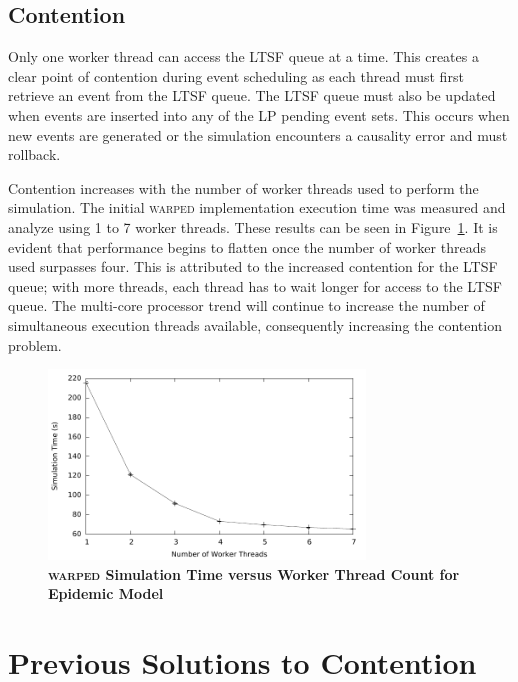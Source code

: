 \documentclass[11pt]{book}
\begin{document}
\subsection{Contention}

Only one worker thread can access the LTSF queue at a time.  This creates a clear point of
contention during event scheduling as each thread must first retrieve an event from the
LTSF queue.  The LTSF queue must also be updated when events are inserted into any of the
LP pending event sets.  This occurs when new events are generated or the simulation
encounters a causality error and must rollback.

Contention increases with the number of worker threads used to perform the simulation.
The initial \textsc{warped} implementation execution time was measured and analyze using 1
to 7 worker threads.  These results can be seen in Figure~\ref{fig:notsx_profile}.  It is
evident that performance begins to flatten once the number of worker threads used
surpasses four.  This is attributed to the increased contention for the LTSF queue; with
more threads, each thread has to wait longer for access to the LTSF queue.  The multi-core
processor trend will continue to increase the number of simultaneous execution threads
available, consequently increasing the contention problem.

\begin{figure}
    \centering
    \graphicspath{ {./figures/} }
    \includegraphics[width=0.75\textwidth,keepaspectratio]{notsx_profile}
    \caption{\textbf{\textsc{warped} Simulation Time versus Worker Thread Count for
        Epidemic Model}}\label{fig:notsx_profile}
\end{figure}

\section{Previous Solutions to Contention}
\end{document}
